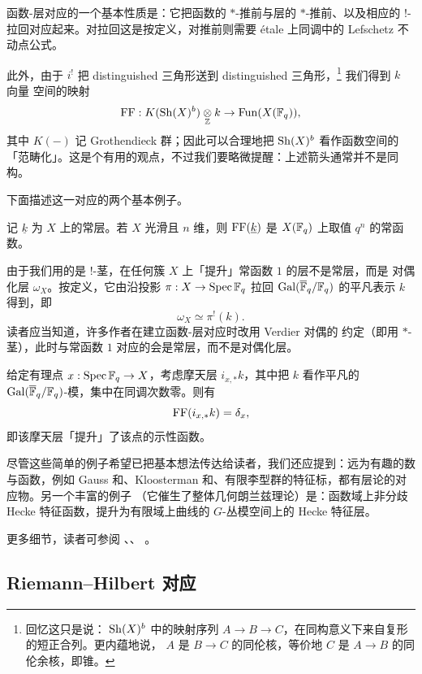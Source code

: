 \ssszh 函数-层对应的一个基本性质是：它把函数的 $*$-推前与层的 $*$-推前、以及相应的
$!$-拉回对应起来。对拉回这是按定义，对推前则需要 étale 上同调中的 Lefschetz 不动点公式。

此外，由于 $i^!$ 把 distinguished 三角形送到 distinguished 三角形，\footnote{回忆这只是说：
$\operatorname{Sh}(X)^b$ 中的映射序列 $A\to B\to C$，在同构意义下来自复形的短正合列。更内蕴地说，
$A$ 是 $B\to C$ 的同伦核，等价地 $C$ 是 $A\to B$ 的同伦余核，即锥。} 我们得到 $k$ 向量
空间的映射
\[
\operatorname{FF}:K(\operatorname{Sh}(X)^b)\underset{\mathbb{Z}}{\otimes}k\to\operatorname{Fun}(X(\mathbb{F}_q)),
\]
其中 $K(-)$ 记 Grothendieck 群；因此可以合理地把 $\operatorname{Sh}(X)^b$ 看作函数空间的
「范畴化」。这是个有用的观点，不过我们要略微提醒：上述箭头通常并不是同构。

\ssszh 下面描述这一对应的两个基本例子。

\begin{ex} 记 $\underline{k}$ 为 $X$ 上的常层。若 $X$ 光滑且 $n$ 维，则 $\operatorname{FF}(\underline{k})$
是 $X(\mathbb{F}_q)$ 上取值 $q^n$ 的常函数。
\end{ex}

\begin{re} 由于我们用的是 $!$-茎，在任何簇 $X$ 上「提升」常函数 $1$ 的层不是常层，而是
对偶化层 $\omega_X$。按定义，它由沿投影 $\pi:X\to\operatorname{Spec }\mathbb{F}_q$ 拉回
$\operatorname{Gal}(\overline{\mathbb{F}}_q/\mathbb{F}_q)$ 的平凡表示 $k$ 得到，即
$$\omega_X\simeq\pi^!(k).$$ 读者应当知道，许多作者在建立函数-层对应时改用 Verdier 对偶的
约定（即用 $*$-茎），此时与常函数 $1$ 对应的会是常层，而不是对偶化层。
\end{re}

\begin{ex} 给定有理点 $x:\operatorname{Spec }\mathbb{F}_q\to X$，考虑摩天层 $i_{x,*}k$，其中把 $k$ 看作平凡的
$\operatorname{Gal}(\overline{\mathbb{F}}_q/\mathbb{F}_q)$-模，集中在同调次数零。则有
\[
\operatorname{FF}(i_{x,*}k)=\delta_x,
\]
即该摩天层「提升」了该点的示性函数。
\end{ex}

尽管这些简单的例子希望已把基本想法传达给读者，我们还应提到：远为有趣的数与函数，例如
Gauss 和、Kloosterman 和、有限李型群的特征标，都有层论的对应物。另一个丰富的例子
（它催生了整体几何朗兰兹理论）是：函数域上非分歧 Hecke 特征函数，提升为有限域上曲线的
$G$-丛模空间上的 Hecke 特征层。

\ssszh 更多细节，读者可参阅 \cite{milnenotes}、\cite{milneetalebook}、
\cite{freitagbook}。

\subsection{Riemann--Hilbert 对应}

